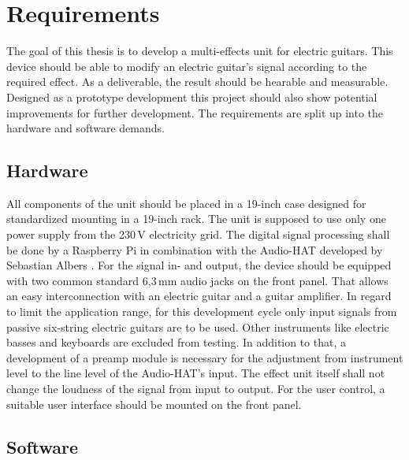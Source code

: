 \newpage
\chapter{Requirements}

The goal of this thesis is to develop a multi-effects unit for electric guitars.
This device should be able to modify an electric guitar's signal according to the required 
effect. As a deliverable, the result should be hearable and measurable.
Designed as a prototype development this project should also show potential improvements for
further development. 
The requirements are split up into the hardware and software demands.

\section{Hardware}

All components of the unit should be placed in a 19-inch case designed for standardized mounting
in a 19-inch rack.
The unit is supposed to use only one power supply from the 230\,V electricity  grid.
The digital signal processing shall be done by a Raspberry Pi in combination with the Audio-HAT developed by Sebastian Albers \cite{Albers:2017}. 
For the signal in- and output, the device should be equipped with two common standard 6,3\,mm audio jacks on the front panel. That allows an easy interconnection with an electric guitar and a guitar amplifier.
In regard to limit the application range, for this development cycle only input signals from passive six-string electric guitars are to be used. Other instruments like electric basses and keyboards are excluded from testing.
In addition to that, a development of a preamp module is necessary for the adjustment from instrument level to the line level of the Audio-HAT's input. The effect unit itself shall not change the loudness of the signal from input to output.
For the user control, a suitable user interface should be mounted on the front panel.


\section{Software}

